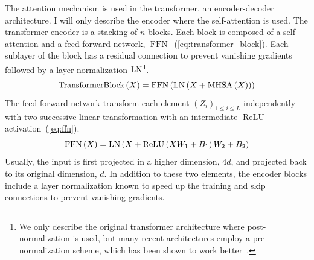 \documentclass[../main.tex]{subfiles}
\begin{document}
		The attention mechanism is used in the transformer, an encoder-decoder architecture.
		I will only describe the encoder where the self-attention is used.
		The transformer encoder is a stacking of \(n\) blocks.
		Each block is composed of a self-attention and a feed-forward network, \(\operatorname{FFN}\)~(\cref{eq:transformer_block}).
		Each sublayer of the block has a residual connection to prevent vanishing gradients followed by a layer normalization \(\operatorname{LN}\)\footnote{We only describe the original transformer architecture where post-normalization is used, but many recent architectures employ a pre-normalization scheme, which has been shown to work better~\cite{TransformerpreLN}.}.
		\begin{equation}
			\operatorname{TransformerBlock}\left(X\right) = \operatorname{FFN}\left(\LN\left(X + \MHSA\left(X\right)\right)\right)\label{eq:transformer_block}
		\end{equation}
		The feed-forward network transform each element \({\left(Z_i\right)}_{1 \leq i \leq L}\) independently with two successive linear transformation with an intermediate \(\operatorname{ReLU}\) activation~(\cref{eq:ffn}).
		\begin{equation}%
			\operatorname{FFN}\left(X\right) = \LN\left( X + \operatorname{ReLU}\left(XW_1 + B_1\right)W_2 + B_2\right) \label{eq:ffn}
		\end{equation}
		Usually, the input is first projected in a higher dimension, \(4d\), and projected back to its original dimension, \(d\).
		In addition to these two elements, the encoder blocks include a layer normalization known to speed up the training and skip connections to prevent vanishing gradients.
\end{document}
